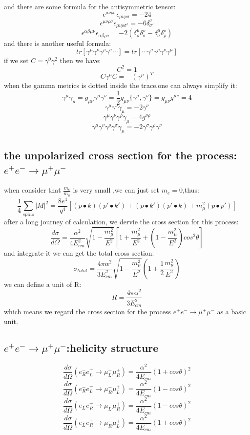 and there are some formula for the antisymmetric tensor:
\[\epsilon^{\mu\nu\rho\sigma}\epsilon_{\mu\nu\rho\sigma}=-24\]
\[\epsilon^{\mu\nu\rho\sigma}\epsilon_{\mu\nu\rho\sigma'}=-6\delta^\sigma_{\sigma'}\]
\[\epsilon^{\alpha\beta\mu\nu}\epsilon_{\alpha\beta\rho\sigma}=-2(\delta^{\mu}_\rho\delta^\nu_\sigma-\delta^{\mu}_\sigma\delta^\nu_\rho)\]
and there is another useful formula:
\[tr[\gamma^\mu\gamma^\nu\gamma^\rho\gamma^\sigma\cdots]=tr[\cdots\gamma^\sigma\gamma^\rho\gamma^\nu\gamma^\mu]\]
if we set $C=\gamma^0\gamma^2$ then we have:
\[C^2=1\]
\[C\gamma^\mu C=-(\gamma^\mu)^T\]
when the gamma metrics is dotted inside the trace,one can always simplify it:
\[\gamma^\mu\gamma_\mu=g_{\mu\nu}\gamma^\mu\gamma^\nu=\frac{1}{2}g_{\mu\nu}\{\gamma^\mu,\gamma^\nu\}=g_{\mu\nu}g^{\mu\nu}=4\]
\[\gamma^\mu\gamma^\nu\gamma_\mu=-2\gamma^\nu\]
\[\gamma^\mu\gamma^\nu\gamma^\rho\gamma_\mu=4g^{\nu\rho}\]
\[\gamma^\mu\gamma^\nu\gamma^\rho\gamma^\sigma\gamma_\mu=-2\gamma^\sigma\gamma^\rho\gamma^\nu\]

\subsection{the unpolarized cross section for the process:$e^+e^-\rightarrow \mu^+\mu^-$}
when consider that $\frac{m_e}{m_{\mu}}$ is very small ,we can just set $m_e=0$,thus:
\[\frac{1}{4}\sum_{spins}|M|^2=\frac{8e^4}{q^4}[(p\bullet k)(p'\bullet k')+(p\bullet k')(p'\bullet k)+m_{\mu}^2(p\bullet p')]\]
after a long journey of calculation, we dervie the cross section for this process:
\[\frac{d\sigma}{d\Omega}=\frac{\alpha^2}{4E_{cm}^2}\sqrt{1-\frac{m_\mu ^2}{E^2}}[1+\frac{m_\mu ^2}{E^2}+(1-\frac{m_\mu ^2}{E^2})cos^2\theta]\]
and integrate it we can get the total cross section:
\[\sigma_{total}=\frac{4\pi \alpha^2}{3E_{cm}^2}\sqrt{1-\frac{m_\mu ^2}{E^2}}(1+\frac{1}{2}\frac{m_\mu ^2}{E^2})\]
we can define a unit of R:
\[R=\frac{4\pi \alpha^2}{3E_{cm}^2}\]
which means we regard  the cross section for the process $e^+e^-\rightarrow \mu^+\mu^-$ as a basic unit.\par

\subsection{$e^+e^-\rightarrow \mu^+\mu^-$:helicity structure}
\[\frac{d\sigma}{d\Omega}(e^-_Re^+_L\rightarrow \mu^-_L\mu^+_R)=\frac{\alpha^2}{4E_{cm}}(1+cos\theta)^2\]
\[\frac{d\sigma}{d\Omega}(e^-_Re^+_L\rightarrow \mu^-_R\mu^+_L)=\frac{\alpha^2}{4E_{cm}}(1-cos\theta)^2\]
\[\frac{d\sigma}{d\Omega}(e^-_Le^+_R\rightarrow \mu^-_L\mu^+_R)=\frac{\alpha^2}{4E_{cm}}(1-cos\theta)^2\]
\[\frac{d\sigma}{d\Omega}(e^-_Le^+_R\rightarrow \mu^-_R\mu^+_L)=\frac{\alpha^2}{4E_{cm}}(1+cos\theta)^2\]

